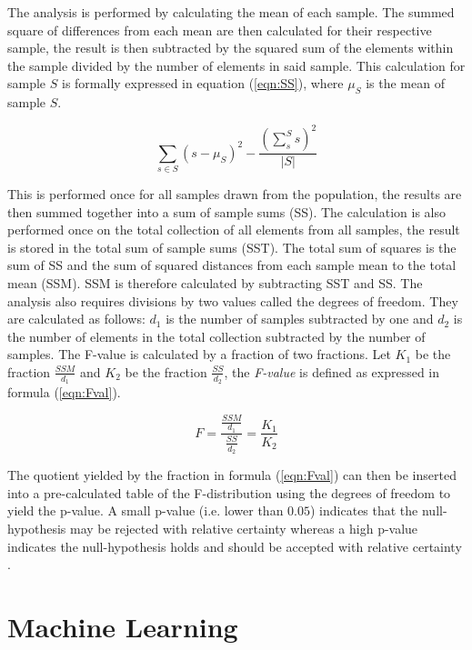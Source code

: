 The analysis is performed by calculating the mean of each sample. The summed square of differences from each mean are then calculated for their respective sample, the result is then subtracted by the squared sum of the elements within the sample divided by the number of elements in said sample. This calculation for sample $S$ is formally expressed in equation (\ref{eqn:SS}), where $\mu_S$ is the mean of sample $S$.

\begin{equation}
\label{eqn:SS}
 \sum_{s \in S} (s - \mu_S)^2 - \frac{(\sum_{s}^{S} s)^2}{|S|} 
\end{equation}

This is performed once for all samples drawn from the population, the results are then summed together into a sum of sample sums (SS). The calculation is also performed once on the total collection of all elements from all samples, the result is stored in the total sum of sample sums (SST). The total sum of squares is the sum of SS and the sum of squared distances from each sample mean to the total mean (SSM). SSM is therefore calculated by subtracting SST and SS. The analysis also requires divisions by two values called the degrees of freedom. They are calculated as follows: $d_1$ is the number of samples subtracted by one and $d_2$ is the number of elements in the total collection subtracted by the number of samples. The F-value is calculated by a fraction of two fractions. Let  $K_1$ be the fraction $\frac{SSM}{d_1}$ and $K_2$ be the fraction $\frac{SS}{d_2}$, the \textit{F-value} is defined as expressed in formula (\ref{eqn:Fval}).

\begin{equation}
\label{eqn:Fval}
 F = \frac{\frac{SSM}{d_1}}{\frac{SS}{d_2}} = \frac{K_1}{K_2}
\end{equation}

The quotient yielded by the fraction in formula (\ref{eqn:Fval}) can then be inserted into a pre-calculated table of the F-distribution using the degrees of freedom to yield the p-value. A small p-value (i.e. lower than $0.05$) indicates that the null-hypothesis may be rejected with relative certainty whereas a high p-value indicates the null-hypothesis holds and should be accepted with relative certainty \cite{lowry2014concepts}.


\section{Machine Learning}

